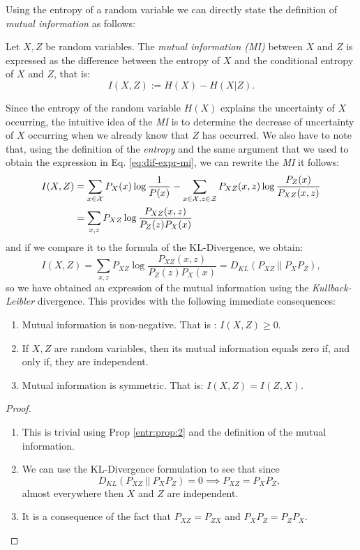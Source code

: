 
\label{Chapter:MI}
Using the entropy of a random variable we can directly state the definition of \emph{mutual information} as follows:

\begin{ndef}
Let $X,Z$ be random variables. The \emph{mutual information (MI)} between $X$ and $Z$ is expressed as the difference between the entropy of $X$ and the conditional entropy of $X$ and $Z$, that is:
$$
I(X,Z) := H(X) - H(X|Z).
$$
\end{ndef}
Since the entropy of the random variable $H(X)$ explains the uncertainty of $X$ occurring, the intuitive idea of the \emph{MI} is to determine the decrease of uncertainty of $X$ occurring when we already
know that $Z$ has occurred. We also have to note that, using the definition of the \emph{entropy} and the same argument that we used to obtain the expression in Eq. \ref{eq:dif-expr-mi}, we can rewrite the \emph{MI}  it follows:
\begin{align}
I(X,Z) & = \sum_{x \in \mathcal{X}}P_X(x) \log \frac{1}{P(x)} - \sum_{x \in \mathcal{X}, z \in \mathcal Z} P_{XZ}(x,z) \log \frac{P_Z(x)}{P_{XZ}(x,z)} \nonumber \\
 & = \sum_{x,z}P_{XZ}\log \frac{P_{XZ}(x,z)}{P_Z(z)P_X(x)} \label{MI:sum:xz}
\end{align}
and if we compare it to the formula of the KL-Divergence, we obtain:
\[
I(X,Z)  = \sum_{x,z}P_{XZ}\log \frac{P_{XZ}(x,z)}{P_Z(z)P_X(x)} = D_{KL}(P_{XZ} \ || \ P_X P_Z),
\]
so we have obtained an expression of the mutual information using the \emph{Kullback-Leibler} divergence. This provides with the following immediate consequences:

\begin{corollary}

\begin{enumerate}[label=$(\roman*)$]
\item Mutual information is non-negative. That is : $I(X,Z) \geq 0$.
\item If $X,Z$ are random variables, then its mutual information equals zero if, and only if, they are independent. 

\item Mutual information is symmetric. That is: $I(X,Z) = I(Z,X)$.
\end{enumerate}
\end{corollary}

\begin{proof}
    \begin{enumerate}[label=$(\roman*)$]
        \item This is trivial using Prop \ref{entr:prop:2} and the definition of the mutual information.
        \item We can use the KL-Divergence formulation to see that since $$
        D_{KL}(P_{XZ} \ || \ P_X P_Z) = 0 \implies P_{XZ} = P_X P_Z,
        $$ 
        almost everywhere then $X$ and $Z$ are independent.
        \item It is a consequence of the fact that $P_{XZ} = P_{ZX}$ and $P_X P_Z = P_Z P_X$.
        \end{enumerate}
\end{proof}

